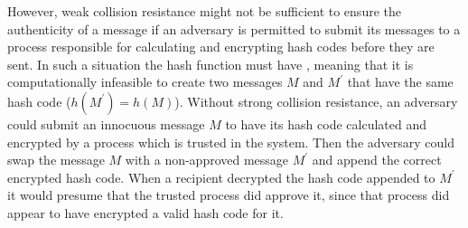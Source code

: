 However, weak collision resistance might not be sufficient to ensure the
authenticity of a message if an adversary is permitted to submit its
messages to a process responsible for calculating and encrypting hash codes before they
are sent.
In such a situation the hash function must have ,
meaning that it is computationally infeasible to create two messages $M$ and $M^\prime$
that have the same hash code ($h(M^\prime)=h(M)$).
Without strong collision resistance, an adversary could submit an innocuous
message $M$ to have its hash code calculated and encrypted by a process which is
trusted in the system. Then the adversary could swap the message $M$ with
a non-approved message $M^\prime$ and append the correct encrypted hash code.
When a recipient decrypted the hash code appended to $M^\prime$ it would presume
that the trusted process did approve it, since that process did appear to have
encrypted a valid hash code for it.

\newcommand{\wordvariants}[1]%
  {\hspace{-2mm}\begin{scriptsize}\begin{tabular}{c}#1\end{tabular}\end{scriptsize}\hspace{-2mm}}

